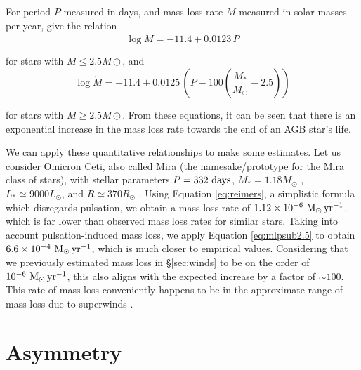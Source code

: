 \documentclass[twocolumn]{aastex63}
\begin{document}
For period $P$ measured in days, and mass loss rate $\dot M$ measured in solar masses per year, \cite{vassiliadis} give the relation 
\begin{equation}\label{eq:mlpsub2.5}
    \log \dot M = -11.4 + 0.0123\,P
\end{equation}

for stars with $M\leq 2.5M\odot$, and
\begin{equation}\label{eq:mlpover2.5}
    \log \dot M = -11.4 + 0.0125\,\left(P - 100\left(\frac{M_*}{M_\odot} - 2.5\right)\right) 
\end{equation}

for stars with $M\geq 2.5M\odot$. From these equations, it can be seen that there is an exponential increase in the mass loss rate towards the end of an AGB star's life. 

We can apply these quantitative relationships to make some estimates. Let us consider Omicron Ceti, also called Mira (the namesake/prototype for the Mira class of stars), with stellar parameters $P = 332~{\rm days}$, $M_* = 1.18M_\odot$ \citep{wyatt}, $L_* \simeq 9000 L_\odot$, and $R \simeq 370 R_\odot$ \citep{woodruff}. Using Equation \ref{eq:reimers}, a simplistic formula which disregards pulsation, we obtain a mass loss rate of $1.12\times 10^{-6}~{\rm M_\odot\,yr^{-1}}$, which is far lower than observed mass loss rates for similar stars. Taking into account pulsation-induced mass loss, we apply Equation \ref{eq:mlpsub2.5} to obtain $6.6\times 10^{-4}~{\rm M_\odot\,yr^{-1}}$, which is much closer to empirical values. Considering that we previously estimated mass loss in \S \ref{sec:winds} to be on the order of $10^{-6}~{\rm M_\odot\,yr^{-1}}$, this also aligns with the expected increase by a factor of $\sim 100$. This rate of mass loss conveniently happens to be in the approximate range of mass loss due to superwinds \citep{iben}. 

\section{Asymmetry}\label{sec:asymmetry}
\end{document}
